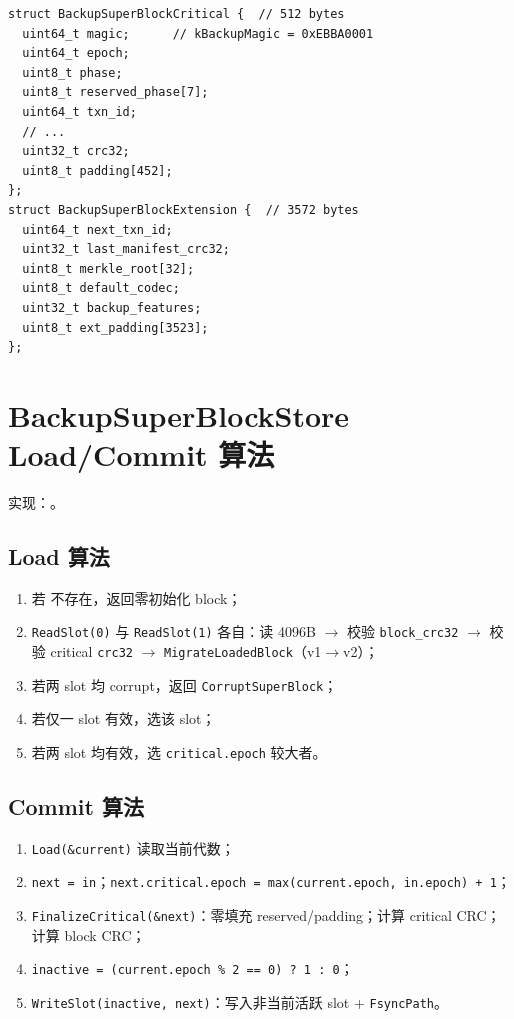 \begin{lstlisting}[caption={SuperBlock 结构（节选）},label={lst:superblock}]
struct BackupSuperBlockCritical {  // 512 bytes
  uint64_t magic;      // kBackupMagic = 0xEBBA0001
  uint64_t epoch;
  uint8_t phase;
  uint8_t reserved_phase[7];
  uint64_t txn_id;
  // ...
  uint32_t crc32;
  uint8_t padding[452];
};
struct BackupSuperBlockExtension {  // 3572 bytes
  uint64_t next_txn_id;
  uint32_t last_manifest_crc32;
  uint8_t merkle_root[32];
  uint8_t default_codec;
  uint32_t backup_features;
  uint8_t ext_padding[3523];
};
\end{lstlisting}

\section{BackupSuperBlockStore Load/Commit 算法}

实现：。

\subsection{Load 算法}

\begin{enumerate}[nosep]
  \item 若  不存在，返回零初始化 block；
  \item \texttt{ReadSlot(0)} 与 \texttt{ReadSlot(1)} 各自：读 4096B $\rightarrow$ 校验 \texttt{block\_crc32} $\rightarrow$ 校验 critical \texttt{crc32} $\rightarrow$ \texttt{MigrateLoadedBlock}（v1$\rightarrow$v2）；
  \item 若两 slot 均 corrupt，返回 \texttt{CorruptSuperBlock}；
  \item 若仅一 slot 有效，选该 slot；
  \item 若两 slot 均有效，选 \texttt{critical.epoch} 较大者。
\end{enumerate}

\subsection{Commit 算法}

\begin{enumerate}[nosep]
  \item \texttt{Load(\&current)} 读取当前代数；
  \item \texttt{next = in}；\texttt{next.critical.epoch = max(current.epoch, in.epoch) + 1}；
  \item \texttt{FinalizeCritical(\&next)}：零填充 reserved/padding；计算 critical CRC；计算 block CRC；
  \item \texttt{inactive = (current.epoch \% 2 == 0) ? 1 : 0}；
  \item \texttt{WriteSlot(inactive, next)}：写入非当前活跃 slot + \texttt{FsyncPath}。
\end{enumerate}

